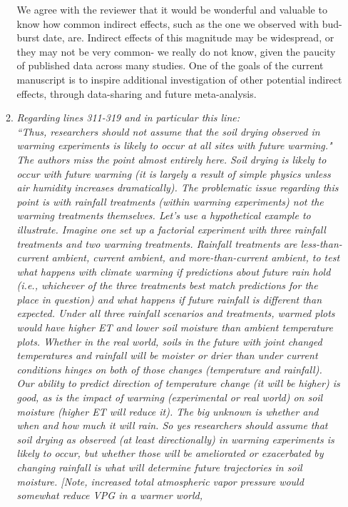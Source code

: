 \documentclass[11pt,a4paper]{letter}
\begin{document}
\begin{letter}{}
\begin{enumerate}
\begin{enumerate}
\par We agree with the reviewer that it would be wonderful and valuable to know how common indirect effects, such as the one we observed with bud-burst date, are. Indirect effects of this magnitude may be widespread, or they may not be very common- we really do not know, given the paucity of published data across many studies. One of the goals of the current manuscript is to inspire additional investigation of other potential indirect effects, through data-sharing and future meta-analysis.
\item \emph{Regarding lines 311-319 and in particular this line:\\
``Thus, researchers should not assume that the soil drying observed in warming experiments is likely to occur
at all sites with future warming."}
\\
\emph{The authors miss the point almost entirely here. Soil drying is likely to occur
with future warming (it is largely a result of simple physics unless air humidity
increases dramatically). The problematic issue regarding this point is with
rainfall treatments (within warming experiments) not the warming treatments
themselves. Let's use a hypothetical example to illustrate. Imagine one set up
a factorial experiment with three rainfall treatments and two warming
treatments. Rainfall treatments are less-than-current ambient, current
ambient, and more-than-current ambient, to test what happens with climate
warming if predictions about future rain hold (i.e., whichever of the three
treatments best match predictions for the place in question) and what
happens if future rainfall is different than expected. Under all three rainfall
scenarios and treatments, warmed plots would have higher ET and lower soil
moisture than ambient temperature plots. Whether in the real world, soils in
the future with joint changed temperatures and rainfall will be moister or drier
than under current conditions hinges on both of those changes (temperature
and rainfall). Our ability to predict direction of temperature change (it will be
higher) is good, as is the impact of warming (experimental or real world) on
soil moisture (higher ET will reduce it). The big unknown is whether and when
and how much it will rain. So yes researchers should assume that soil drying
as observed (at least directionally) in warming experiments is likely to occur,
but whether those will be ameliorated or exacerbated by changing rainfall is
what will determine future trajectories in soil moisture. [Note, increased total
atmospheric vapor pressure would somewhat reduce VPG in a warmer world,
}
\end{enumerate}
\end{enumerate}
\end{letter}
\end{document}
